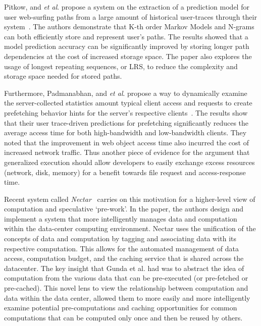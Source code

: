 Pitkow, and {\it et al}. propose a system on the extraction of a prediction
model for user web-surfing paths from a large amount of historical user-traces
through their system~\cite{pitkow}. The authors demonstrate that K-th order
Markov Models and N-grams can both efficiently store and represent user's paths.
The results showed that a model prediction accuracy can be significantly
improved by storing longer path dependencies at the cost of increased storage
space. The paper also explores the usage of longest repeating sequences, or
LRS, to reduce the complexity and storage space needed for stored paths.

Furthermore, Padmanabhan, and {\it et al}. propose a way to dynamically examine
the server-collected statistics amount typical client access and
requests to create prefetching behavior hints for the server's respective
clients~\cite{padmanabhan}.  The results show that their user trace-driven
predictions for prefetching significantly reduces the average access time for
both high-bandwidth and low-bandwidth clients. They noted that the improvement
in web object access time also incurred the cost of increased network traffic.
Thus another piece of evidence for the argument that generalized execution
should allow developers to easily exchange excess resources (network, disk,
memory) for a benefit towards file request and access-response time.

Recent system called {\it Nectar}~\cite{nectar} carries on this motivation for a
higher-level view of computation and speculative `pre-work'. In the paper, the
authors design and implement a system that more intelligently manages data and
computation within the data-center computing environment. Nectar uses the
unification of the concepts of data and computation by tagging and associating
data with its respective computation. This allows for the automated management
of data access, computation budget, and the caching service that is shared
across the datacenter.
The key insight that Gunda et al. had was to abstract the idea of computation
from the various data that can be pre-executed (or pre-fetched or pre-cached).
This novel lens to view the relationship between computation and data within the
data center, allowed them to more easily and more intelligently examine
potential pre-computations and caching opportunities for common computations
that can be computed only once and then be reused by others.

